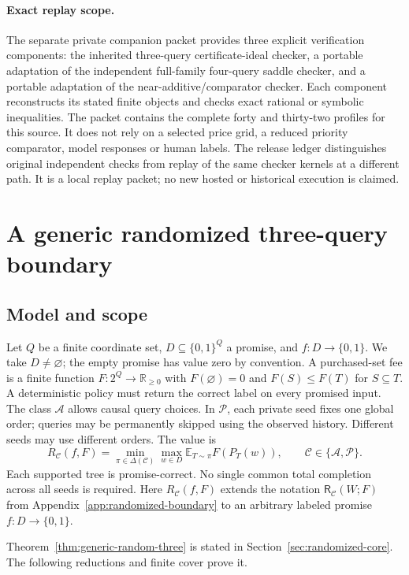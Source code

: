 \documentclass[pdflatex,sn-mathphys-num]{sn-jnl}
\newcommand{\RR}{\mathsf{R}}
\theoremstyle{thmstyleone}
\theoremstyle{thmstylethree}
\theoremstyle{thmstyletwo}
\begin{document}
\paragraph*{Exact replay scope.}
The separate private companion packet 
provides three explicit verification components: the inherited
three-query certificate-ideal checker, a portable adaptation of the
independent full-family four-query saddle checker, and a portable
adaptation of the near-additive/comparator checker. Each component
reconstructs its stated finite objects and checks exact rational or
symbolic inequalities. The packet contains the complete forty and
thirty-two profiles for this source. It does not rely on a selected
price grid, a reduced priority comparator, model responses or human
labels. The release ledger distinguishes original independent checks
from replay of the same checker kernels at a different path. It is a
local replay packet; no new hosted or historical execution is claimed.


\section{A generic randomized three-query boundary}
\label{sec:generic-random-three}

\subsection{Model and scope}
Let $Q$ be a finite coordinate set, $D\subseteq\{0,1\}^{Q}$ a promise,
and $f:D\to\{0,1\}$. We take $D\ne\varnothing$; the empty promise has
value zero by convention. A purchased-set fee is a finite function
$F:2^Q\to\mathbb R_{\geq0}$ with $F(\varnothing)=0$ and
$F(S)\leq F(T)$ for $S\subseteq T$.
A deterministic policy must return the correct label on every promised input.
The class $\mathcal A$ allows causal query choices. In $\mathcal P$, each
private seed fixes one global order; queries may be permanently skipped
using the observed history. Different seeds may use different orders.
The value is
\[
 R_{\mathcal C}(f,F)=
 \min_{\pi\in\Delta(\mathcal C)}
 \max_{w\in D}\mathbb E_{T\sim\pi}F(P_T(w)),
 \qquad \mathcal C\in\{\mathcal A,\mathcal P\}.
\]
Each supported tree is promise-correct. No single common total completion
across all seeds is required. Here $R_{\mathcal C}(f,F)$ extends the
notation $\RR_{\mathcal C}(W;F)$ from Appendix~\ref{app:randomized-boundary}
to an arbitrary labeled promise $f:D\to\{0,1\}$.

Theorem~\ref{thm:generic-random-three} is stated in Section~\ref{sec:randomized-core}. The following reductions and finite cover prove it.
\end{document}
